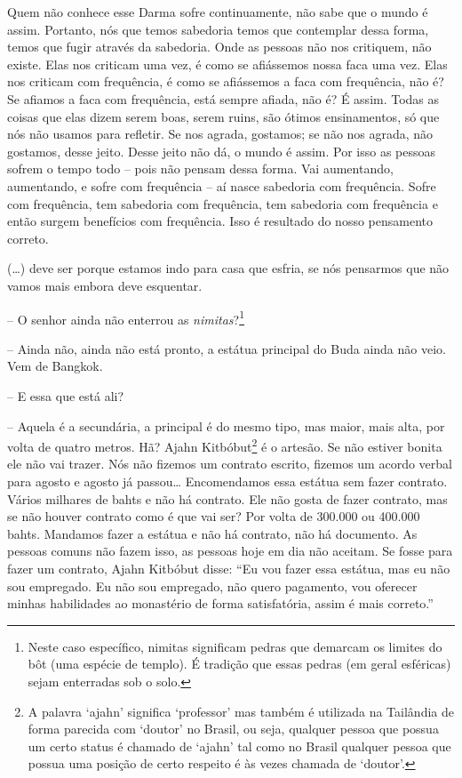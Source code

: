 Quem não conhece esse Darma sofre continuamente, não sabe que o
mundo é assim. Portanto, nós que temos sabedoria temos que contemplar
dessa forma, temos que fugir através da sabedoria. Onde as pessoas não
nos critiquem, não existe. Elas nos criticam uma vez, é como se
afiássemos nossa faca uma vez. Elas nos criticam com frequência, é como
se afiássemos a faca com frequência, não é? Se afiamos a faca com
frequência, está sempre afiada, não é? É assim. Todas as coisas que
elas dizem serem boas, serem ruins, são ótimos ensinamentos, só que nós
não usamos para refletir. Se nos agrada, gostamos; se não nos agrada,
não gostamos, desse jeito. Desse jeito não dá, o mundo é assim. Por
isso as pessoas sofrem o tempo todo – pois não pensam dessa forma. Vai
aumentando, aumentando, e sofre com frequência – aí nasce sabedoria com
frequência. Sofre com frequência, tem sabedoria com frequência, tem
sabedoria com frequência e então surgem benefícios com frequência. Isso
é resultado do nosso pensamento correto.

(…) deve ser porque estamos indo para casa que esfria, se nós
pensarmos que não vamos mais embora deve esquentar. 

-- O senhor ainda não enterrou as \textit{nimitas}?\footnote{Neste
caso específico, nimitas significam pedras que demarcam os limites do
bôt (uma espécie de templo). É tradição que essas pedras (em geral
esféricas) sejam enterradas sob o solo.}

-- Ainda não, ainda não está pronto, a estátua principal do Buda
ainda não veio. Vem de Bangkok.

-- E essa que está ali?

-- Aquela é a secundária, a principal é do mesmo tipo, mas maior,
mais alta, por volta de quatro metros. Hã? Ajahn Kitbóbut\footnote{A
palavra ‘ajahn’ significa ‘professor’ mas também é utilizada na
Tailândia de forma parecida com ‘doutor’ no Brasil, ou seja, qualquer
pessoa que possua um certo status é chamado de ‘ajahn’ tal como no
Brasil qualquer pessoa que possua uma posição de certo respeito é às
vezes chamada de ‘doutor’.} é o artesão. Se não estiver bonita ele não
vai trazer. Nós não fizemos um contrato escrito, fizemos um acordo
verbal para agosto e agosto já passou… Encomendamos essa estátua sem
fazer contrato. Vários milhares de bahts e não há contrato. Ele não
gosta de fazer contrato, mas se não houver contrato como é que vai ser?
Por volta de 300.000 ou 400.000 bahts. Mandamos fazer a estátua e não
há contrato, não há documento. As pessoas comuns não fazem isso, as
pessoas hoje em dia não aceitam. Se fosse para fazer um contrato, Ajahn
Kitbóbut disse: “Eu vou fazer essa estátua, mas eu não sou empregado.
Eu não sou empregado, não quero pagamento, vou oferecer minhas
habilidades ao monastério de forma satisfatória, assim é mais correto.”

